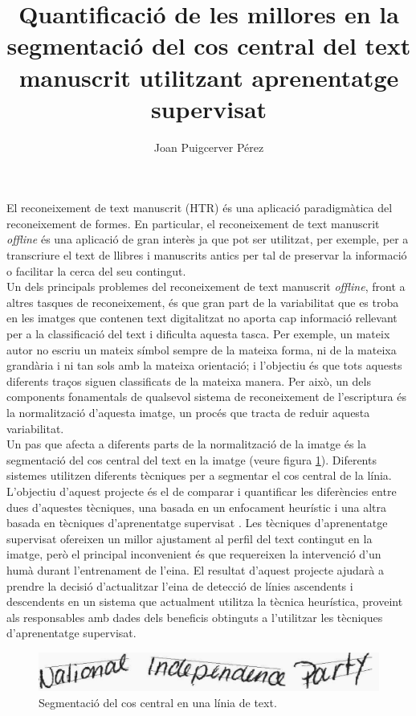 \documentclass[a4paper]{article}
\author{Joan Puigcerver Pérez}
\title{Quantificació de les millores en la segmentació del cos central del text manuscrit utilitzant aprenentatge supervisat}
\begin{document}
\maketitle

El reconeixement de text manuscrit (HTR) és una aplicació paradigmàtica del reconeixement de formes. En particular, el reconeixement de text manuscrit \emph{offline} és una aplicació de gran interès ja que pot ser utilitzat, per exemple, per a transcriure el text de llibres i manuscrits antics per tal de preservar la informació o facilitar la cerca del seu contingut. \\

Un dels principals problemes del reconeixement de text manuscrit \emph{offline}, front a altres tasques de reconeixement, és que gran part de la variabilitat que es troba en les imatges que contenen text digitalitzat no aporta cap informació rellevant per a la classificació del text i dificulta aquesta tasca. Per exemple, un mateix autor no escriu un mateix símbol sempre de la mateixa forma, ni de la mateixa grandària i ni tan sols amb la mateixa orientació; i l'objectiu és que tots aquests diferents traços siguen classificats de la mateixa manera. Per això, un dels components fonamentals de qualsevol sistema de reconeixement de l'escriptura és la normalització d'aquesta imatge, un procés que tracta de reduir aquesta variabilitat. \\

Un pas que afecta a diferents parts de la normalització de la imatge és la segmentació del cos central del text en la imatge (veure figura \ref{fig:adlines}). Diferents sistemes utilitzen diferents tècniques per a segmentar el cos central de la línia. L'objectiu d'aquest projecte és el de comparar i quantificar les diferències entre dues d'aquestes tècniques, una basada en un enfocament heurístic \cite{Pastor07} i una altra basada en tècniques d'aprenentatge supervisat \cite{Espana10}. Les tècniques d'aprenentatge supervisat ofereixen un millor ajustament al perfil del text contingut en la imatge, però el principal inconvenient és que requereixen la intervenció d'un humà durant l'entrenament de l'eina. El resultat d'aquest projecte ajudarà a prendre la decisió d'actualitzar l'eina de detecció de línies ascendents i descendents en un sistema que actualment utilitza la tècnica heurística, proveint als responsables amb dades dels beneficis obtinguts a l'utilitzar les tècniques d'aprenentatge supervisat.

\begin{figure}[H]
\includegraphics[width=\textwidth]{a01-011x-01_final}
\caption{Segmentació del cos central en una línia de text.}
\label{fig:adlines}
\end{figure}
\end{document}
